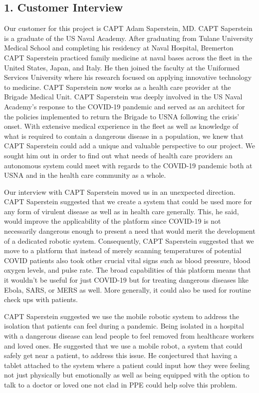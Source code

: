 ﻿\documentclass[10pt]{article}
\begin{document}
\subsection{1. Customer Interview}
Our customer for this project is CAPT Adam Saperstein, MD. CAPT Saperstein is a graduate of the US Naval Academy. After graduating from Tulane University Medical School and completing his residency at Naval Hospital, Bremerton CAPT Saperstein practiced family medicine at naval bases across the fleet in the United States, Japan, and Italy. He then joined the faculty at the Uniformed Services University where his research focused on applying innovative technology to medicine. CAPT Saperstein now works as a health care provider at the Brigade Medical Unit. CAPT Saperstein was deeply involved in the US Naval Academy’s response to the COVID-19 pandemic and served as an architect for the policies implemented to return the Brigade to USNA following the crisis’ onset. With extensive medical experience in the fleet as well as knowledge of what is required to contain a dangerous disease in a population, we knew that CAPT Saperstein could add a unique and valuable perspective to our project. We sought him out in order to find out what needs of health care providers an autonomous system could meet with regards to the COVID-19 pandemic both at USNA and in the health care community as a whole. 

Our interview with CAPT Saperstein moved us in an unexpected direction. CAPT Saperstein suggested that we create a system that could be used more for any form of virulent disease as well as in health care generally. This, he said, would improve the applicability of the platform since COVID-19 is not necessarily dangerous enough to present a need that would merit the development of a dedicated robotic system. Consequently, CAPT Saperstein suggested that we move to a platform that instead of merely scanning temperatures of potential COVID patients also took other crucial vital signs such as blood pressure, blood oxygen levels, and pulse rate. The broad capabilities of this platform means that it wouldn’t be useful for just COVID-19 but for treating dangerous diseases like Ebola, SARS, or MERS as well. More generally, it could also be used for routine check ups with patients.
 
CAPT Saperstein suggested we use the mobile robotic system to address the isolation that patients can feel during a pandemic. Being isolated in a hospital with a dangerous disease can lead people to feel removed from healthcare workers and loved ones. He suggested that we use a mobile robot, a system that could safely get near a patient, to address this issue. He conjectured that having a tablet attached to the system where a patient could input how they were feeling not just physically but emotionally as well as being equipped with the option to talk to a doctor or loved one not clad in PPE could help solve this problem. 
\end{document}
